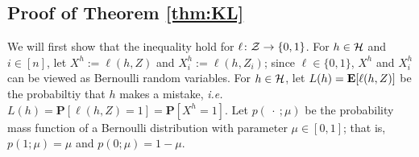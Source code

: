 \documentclass{article}
\makeatletter
\renewcommand{\P}{\mathbf{P}}
\renewenvironment{proof}[1][\proofname]{\par
	\pushQED{\qed}%
	\normalfont \topsep6\p@\@plus6\p@\relax
	\trivlist
	\item[%
	\hskip\labelsep
	\normalfont\bfseries %
	#1%
	]\ignorespaces
}{%
	\popQED\endtrivlist\@endpefalse
}
\let\qed\relax %
\DeclareRobustCommand{\qed}{%
	\ifmmode \mathqed
	\else
	\leavevmode\unskip\penalty\@M\hbox{}\nobreak\hfill%
	\hbox{\qedsymbol}%
	\fi
}
\makeatother
\begin{document}
\subsection{Proof of Theorem \ref{thm:KL}}
\begin{proof}
	We will first show that the inequality hold for $\ell\colon \mathcal Z \rightarrow \{0,1\}$. 
For $h \in \mathcal H$ and $i\in[n]$, let $X^h := \ell(h,Z)$ and
$X^{h}_i := \ell(h, Z_i)$; since $\ell \in \{0,1\}$, $X^h$ and $X^h_i$ can be viewed as Bernoulli random variables. For $h\in \mathcal H$, let
$L(h) = \mathbf{E} [\ell(h,Z)]$ be the probabiltiy that
$h$ makes a mistake, \emph{i.e.}~$L(h) = \P[\ell(h,Z) = 1]= \P[X^h = 1]$. Let $p(\ \cdot\ ;{\mu})$ be the probability mass function of a Bernoulli distribution with parameter $\mu \in [0,1]$; that is,
$p(1; \mu) = \mu$ and $p(0;\mu)=1-\mu$. 


\end{proof}
\end{document}
